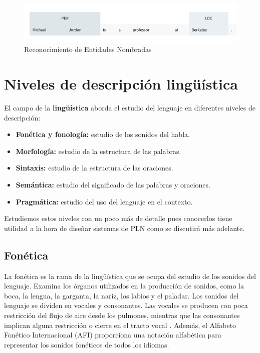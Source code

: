 \begin{figure}[h]
	\centering
	\includegraphics[scale=0.4]{pics/NER.png}
	\caption{Reconocimiento de Entidades Nombradas}
	\label{fig:ner}
\end{figure}


\section{Niveles de descripción lingüística}

El campo de la \textbf{lingüística} aborda el estudio del lenguaje en diferentes niveles de descripción:

\begin{itemize}
  \item \textbf{Fonética y fonología:} estudio de los sonidos del habla.
  \item \textbf{Morfología:} estudio de la estructura de las palabras.
  \item \textbf{Sintaxis:} estudio de la estructura de las oraciones.
  \item \textbf{Semántica:} estudio del significado de las palabras y oraciones.
  \item \textbf{Pragmática:} estudio del uso del lenguaje en el contexto.
\end{itemize}

Estudiemos estos niveles con un poco más de detalle pues conocerlos tiene utilidad a la hora de diseñar sistemas de PLN como se discutirá más adelante.




\subsection{Fonética}

La fonética es la rama de la lingüística que se ocupa del estudio de los sonidos del lenguaje. Examina los órganos utilizados en la producción de sonidos, como la boca, la lengua, la garganta, la nariz, los labios y el paladar. Los sonidos del lenguaje se dividen en vocales y consonantes. Las vocales se producen con poca restricción del flujo de aire desde los pulmones, mientras que las consonantes implican alguna restricción o cierre en el tracto vocal \cite{JohnsonMLSS, fromkin2018introduction}. Además, el Alfabeto Fonético Internacional (AFI) proporciona una notación alfabética para representar los sonidos fonéticos de todos los idiomas.

